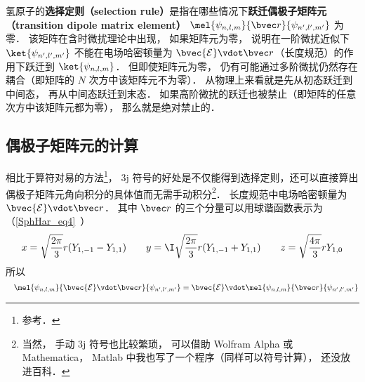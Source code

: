 

氢原子的\textbf{选择定则（selection rule）}是指在哪些情况下\textbf{跃迁偶极子矩阵元（transition dipole matrix element）} $\mel{\psi_{n,l,m}}{\bvec r}{\psi_{n',l',m'}}$ 为零． 该矩阵在含时微扰理论中出现， 如果矩阵元为零， 说明在一阶微扰近似下 $\ket{\psi_{n',l',m'}}$ 不能在电场哈密顿量为 $\bvec{\mathcal{E}}\vdot \bvec r$（长度规范）的作用下跃迁到 $\ket{\psi_{n,l,m}}$． 但即使矩阵元为零， 仍有可能通过多阶微扰仍然存在耦合（即矩阵的 $N$ 次方中该矩阵元不为零）． 从物理上来看就是先从初态跃迁到中间态， 再从中间态跃迁到末态． 如果高阶微扰的跃迁也被禁止（即矩阵的任意次方中该矩阵元都为零）， 那么就是绝对禁止的． %

\subsection{偶极子矩阵元的计算}
相比于算符对易的方法\footnote{参考\cite{GriffQ}．}， 3j 符号的好处是不仅能得到选择定则，还可以直接算出偶极子矩阵元角向积分的具体值而无需手动积分\footnote{当然， 手动 3j 符号也比较繁琐， 可以借助 Wolfram Alpha 或 Mathematica， Matlab 中我也写了一个程序（同样可以符号计算）， 还没放进百科．}． 长度规范中电场哈密顿量为 $\bvec{\mathcal{E}}\vdot \bvec r$． 其中 $\bvec r$ 的三个分量可以用球谐函数表示为（\autoref{SphHar_eq4}~）
\begin{equation}
x = \sqrt{\frac{2\pi}{3}} r (Y_{1,-1} - Y_{1,1}) \qquad
y = \I \sqrt{\frac{2\pi}{3}} r (Y_{1,-1}+Y_{1,1}) \qquad
z = \sqrt{\frac{4\pi}{3}} rY_{1,0}
\end{equation}
所以
\begin{equation}\label{SelRul_eq3}
\quad\mel{\psi_{n,l,m}}{\bvec{\mathcal E}\vdot\bvec r}{\psi_{n',l',m'}} = \bvec{\mathcal E}\vdot\mel{\psi_{n,l,m}}{\bvec r}{\psi_{n',l',m'}}
\end{equation}

